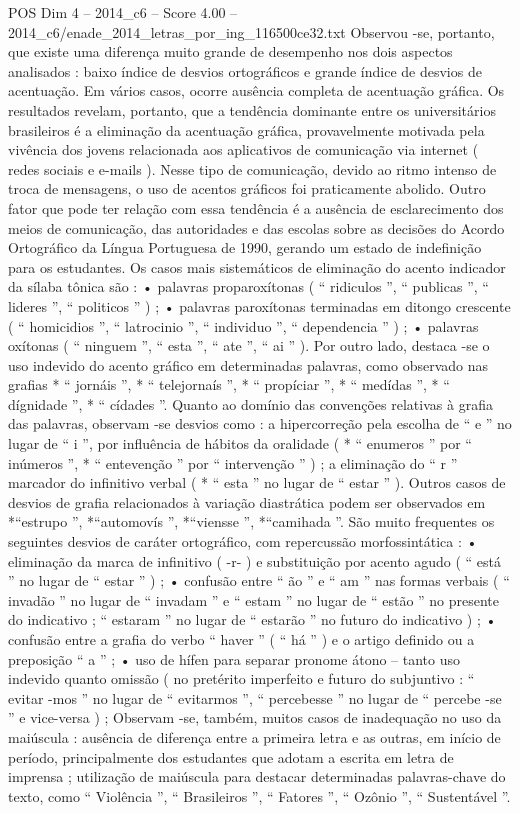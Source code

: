 \begin{textsample}{POS Dim 4 – 2014\_c6 – Score 4.00 – 2014\_c6/enade\_2014\_letras\_por\_ing\_116500ce32.txt}
Observou -se, portanto, que existe uma diferença muito grande de desempenho nos dois aspectos analisados : baixo índice de desvios ortográficos e grande índice de desvios de acentuação.
Em vários casos, ocorre ausência completa de acentuação gráfica.
Os resultados revelam, portanto, que a tendência dominante entre os universitários brasileiros é a eliminação da acentuação gráfica, provavelmente motivada pela vivência dos jovens relacionada aos aplicativos de comunicação via internet ( redes sociais e e-mails ).
Nesse tipo de comunicação, devido ao ritmo intenso de troca de mensagens, o uso de acentos gráficos foi praticamente abolido.
Outro fator que pode ter relação com essa tendência é a ausência de esclarecimento dos meios de comunicação, das autoridades e das escolas sobre as decisões do Acordo Ortográfico da Língua Portuguesa de 1990, gerando um estado de indefinição para os estudantes.
Os casos mais sistemáticos de eliminação do acento indicador da sílaba tônica são : • palavras proparoxítonas ( “ ridiculos ”, “ publicas ”, “ lideres ”, “ politicos ” ) ; • palavras paroxítonas terminadas em ditongo crescente ( “ homicidios ”, “ latrocinio ”, “ individuo ”, “ dependencia ” ) ; • palavras oxítonas ( “ ninguem ”, “ esta ”, “ ate ”, “ ai ” ).
Por outro lado, destaca -se o uso indevido do acento gráfico em determinadas palavras, como observado nas grafias * “ jornáis ”, * “ telejornaís ”, * “ propíciar ”, * “ medídas ”, * “ dígnidade ”, * “ cídades ”.
Quanto ao domínio das convenções relativas à grafia das palavras, observam -se desvios como : a hipercorreção pela escolha de “ e ” no lugar de “ i ”, por influência de hábitos da oralidade ( * “ enumeros ” por “ inúmeros ”, * “ entevenção ” por “ intervenção ” ) ; a eliminação do “ r ” marcador do infinitivo verbal ( * “ esta ” no lugar de “ estar ” ).
Outros casos de desvios de grafia relacionados à variação diastrática podem ser observados em *“estrupo ”, *“automovís ”, *“viensse ”, *“camihada ”.
São muito frequentes os seguintes desvios de caráter ortográfico, com repercussão morfossintática : • eliminação da marca de infinitivo ( -r- ) e substituição por acento agudo ( “ está ” no lugar de “ estar ” ) ; • confusão entre “ ão ” e “ am ” nas formas verbais ( “ invadão ” no lugar de “ invadam ” e “ estam ” no lugar de “ estão ” no presente do indicativo ; “ estaram ” no lugar de “ estarão ” no futuro do indicativo ) ; • confusão entre a grafia do verbo “ haver ” ( “ há ” ) e o artigo definido ou a preposição “ a ” ; • uso de hífen para separar pronome átono – tanto uso indevido quanto omissão ( no pretérito imperfeito e futuro do subjuntivo : “ evitar -mos ” no lugar de “ evitarmos ”, “ percebesse ” no lugar de “ percebe -se ” e vice-versa ) ; Observam -se, também, muitos casos de inadequação no uso da maiúscula : ausência de diferença entre a primeira letra e as outras, em início de período, principalmente dos estudantes que adotam a escrita em letra de imprensa ; utilização de maiúscula para destacar determinadas palavras-chave do texto, como “ Violência ”, “ Brasileiros ”, “ Fatores ”, “ Ozônio ”, “ Sustentável ”.

\end{textsample}
